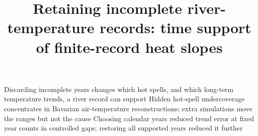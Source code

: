 \documentclass[draft,linenumbers]{agujournal2025}
\begin{document}
\title{Retaining incomplete river-temperature records: time support of finite-record heat slopes}
\keypoints
{Discarding incomplete years changes which hot spells, and which long-term temperature trends, a river record can support}
{Hidden hot-spell undercoverage concentrates in Bavarian air-temperature reconstructions; extra simulations move the ranges but not the cause}
{Choosing calendar years reduced trend error at fixed year counts in controlled gaps; restoring all supported years reduced it further}
\maketitle\par
\end{document}
